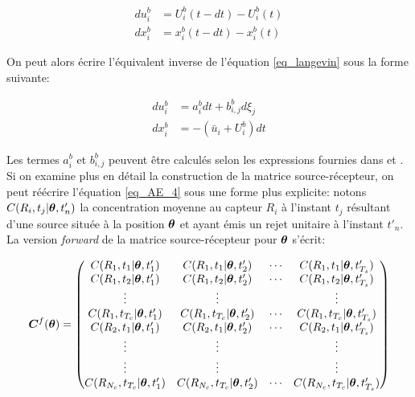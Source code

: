 \begin{equation}
\begin{split}
du_i^b &= U_i^b (t-dt) - U_i^b(t) \\
dx_i^b &= x_i^b (t-dt) - x_i^b(t)
\end{split}
\label{eq_langevin_inv1}
\end{equation}

On peut alors écrire l'équivalent inverse de l'équation \eqref{eq_langevin} sous la forme suivante:

\begin{equation}
	\begin{split}
	du_i^b &= a_i^b dt + b_{i,j}^b d\xi_j \\
	dx_i^b &= -(\bar{u}_i + U_i^b )dt
	\end{split}
	\label{eq_langevin_inv2}
\end{equation}

Les termes $a_i^b$ et $ b_{i,j}^b$ peuvent être calculés selon les expressions fournies dans \cite{Flesch1995} et \cite{Wilson2009}. \\

Si on examine plus en détail la construction de la matrice source-récepteur, on peut réécrire l'équation \eqref{eq_AE_4} sous une forme plus explicite: notons $C(R_i,t_j |{\bm{\theta}}, t'_n)$ la concentration moyenne au capteur $R_i$ à l'instant $t_j$ résultant d'une source située à la position ${\bm{\theta}}$ et ayant émis un rejet unitaire à l'instant $t'_n$. La version \textit{forward} de la matrice source-récepteur pour ${\bm{\theta}}$ s'écrit:

\begin{equation}
{\bm{C}}^f({\bm{\theta}}) = 
\begin{pmatrix}
C(R_1,t_1 | {\bm{\theta}}, t'_1) & C(R_1,t_1 | {\bm{\theta}}, t'_2) & \cdots & C(R_1, t_1 |{\bm{\theta}}, t'_{T_s}) \\
C(R_1,t_2 | {\bm{\theta}}, t'_1) & C(R_1,t_2 | {\bm{\theta}}, t'_2) & \cdots & C(R_1, t_2 |{\bm{\theta}}, t'_{T_s}) \\
\vdots & \vdots & & \vdots \\
C(R_1,t_{T_c} | {\bm{\theta}}, t'_1) & C(R_1,t_{T_c} | {\bm{\theta}}, t'_2) & \cdots & C(R_1, t_{T_c} |{\bm{\theta}}, t'_{T_s}) \\
C(R_2,t_1| {\bm{\theta}}, t'_1) & C(R_2,t_1 | {\bm{\theta}}, t'_2) & \cdots & C(R_2, t_1 |{\bm{\theta}}, t'_{T_s}) \\
\vdots & \vdots & & \vdots \\
\vdots & \vdots & & \vdots \\
C(R_{N_c},t_{T_c} | {\bm{\theta}}, t'_1) & C(R_{N_c},t_{T_c} | {\bm{\theta}}, t'_2) & \cdots & C(R_{N_c}, t_{T_c} |{\bm{\theta}}, t'_{T_s}) \\
\end{pmatrix}
\label{eq_matrix_forward}
\end{equation}

